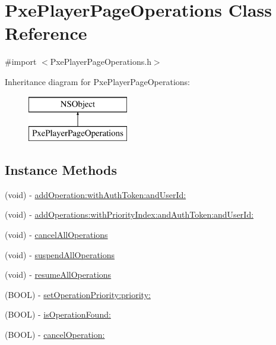 \hypertarget{interface_pxe_player_page_operations}{\section{Pxe\-Player\-Page\-Operations Class Reference}
\label{interface_pxe_player_page_operations}
}


{\ttfamily \#import $<$Pxe\-Player\-Page\-Operations.\-h$>$}

Inheritance diagram for Pxe\-Player\-Page\-Operations\-:\begin{figure}[H]
\begin{center}
\leavevmode
\includegraphics[height=2.000000cm]{interface_pxe_player_page_operations}
\end{center}
\end{figure}
\subsection*{Instance Methods}
\begin{DoxyCompactItemize}
\item 
(void) -\/ \hyperlink{interface_pxe_player_page_operations_aad149c96714e9b45fc27a9cf7f4e685d}{add\-Operation\-:with\-Auth\-Token\-:and\-User\-Id\-:}
\item 
(void) -\/ \hyperlink{interface_pxe_player_page_operations_ac9235b0d49bcadab7cdb92e006706043}{add\-Operations\-:with\-Priority\-Index\-:and\-Auth\-Token\-:and\-User\-Id\-:}
\item 
(void) -\/ \hyperlink{interface_pxe_player_page_operations_abbbea4de9ce2d040313f310be02b0bb6}{cancel\-All\-Operations}
\item 
(void) -\/ \hyperlink{interface_pxe_player_page_operations_ac7449d561b1bdb4c89003679abfaf88a}{suspend\-All\-Operations}
\item 
(void) -\/ \hyperlink{interface_pxe_player_page_operations_a159fb3ede9c90760684aec304e8e8124}{resume\-All\-Operations}
\item 
(B\-O\-O\-L) -\/ \hyperlink{interface_pxe_player_page_operations_a86e99a43d95db1b30b23e7c816f7cdf8}{set\-Operation\-Priority\-:priority\-:}
\item 
(B\-O\-O\-L) -\/ \hyperlink{interface_pxe_player_page_operations_a0718a649b13638e766d121557d5aac88}{is\-Operation\-Found\-:}
\item 
(B\-O\-O\-L) -\/ \hyperlink{interface_pxe_player_page_operations_a95fa29d8fe3e1955d4114d187a27f164}{cancel\-Operation\-:}
\end{DoxyCompactItemize}
